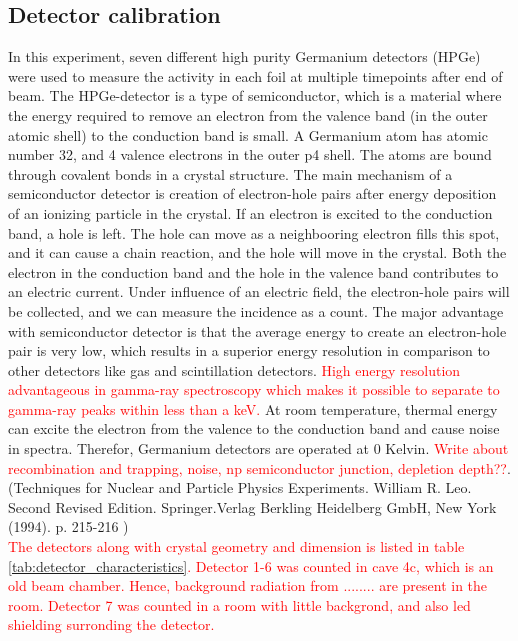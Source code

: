 \documentclass[a4paper,11pt,twoside]{book}
\begin{document}
\subsection{Detector calibration}
In this experiment, seven different high purity Germanium detectors (HPGe) were used to measure the activity in each foil at multiple timepoints after end of beam. The HPGe-detector is a type of semiconductor, which is a material where the energy required to remove an electron from the valence band (in the outer atomic shell) to the conduction band is small. A Germanium atom has atomic number 32, and 4 valence electrons in the outer p4 shell. The atoms are bound through covalent bonds in a crystal structure. The main mechanism of a semiconductor detector is creation of electron-hole pairs after energy deposition of an ionizing particle in the crystal. If an electron is excited to the conduction band, a hole is left. The hole can move as a neighbooring electron fills this spot, and it can cause a chain reaction, and the hole will move in the crystal. Both the electron in the conduction band and the hole in  the valence band contributes to an electric current. Under influence of an electric field, the electron-hole pairs will be collected, and we can measure the incidence as a count. The major advantage with semiconductor detector is that the average energy to create an electron-hole pair is very low, which results in a superior energy resolution in comparison to other detectors like gas and scintillation detectors. \textcolor{red}{High energy resolution advantageous in gamma-ray spectroscopy which makes it possible to separate to gamma-ray peaks within less than a keV.} At room temperature,  thermal energy can excite the electron from the valence to the conduction band and cause noise in spectra. Therefor, Germanium detectors are operated at 0 Kelvin. \textcolor{red}{Write about recombination and trapping, noise, np semiconductor junction, depletion depth??}. (Techniques for Nuclear and Particle Physics Experiments. William R. Leo. Second Revised Edition. Springer.Verlag Berkling Heidelberg GmbH, New York (1994). p. 215-216 )\\


\noindent
\textcolor{red}{
The detectors along with crystal geometry and dimension is listed in table \ref{tab:detector_characteristics}. Detector 1-6 was counted in cave 4c, which is an old beam chamber. Hence, background radiation from ........ are present in the room. Detector 7 was counted in a room with little backgrond, and also led shielding surronding the detector. }
\end{document}
